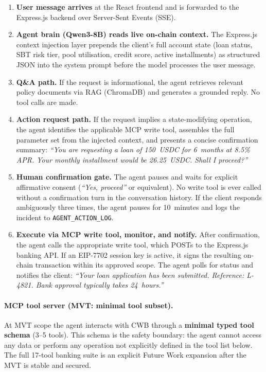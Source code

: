 \documentclass[12pt,a4paper]{report}
\begin{document}
\begin{enumerate}[noitemsep]
\item \textbf{User message arrives} at the React frontend and is forwarded to the Express.js backend over Server-Sent Events (SSE).
\item \textbf{Agent brain (Qwen3-8B) reads live on-chain context.} The Express.js context injection layer prepends the client's full account state (loan status, SBT risk tier, pool utilisation, credit score, active installments) as structured JSON into the system prompt before the model processes the user message.
\item \textbf{Q\&A path.} If the request is informational, the agent retrieves relevant policy documents via RAG (ChromaDB) and generates a grounded reply. No tool calls are made.
\item \textbf{Action request path.} If the request implies a state-modifying operation, the agent identifies the applicable MCP write tool, assembles the full parameter set from the injected context, and presents a concise confirmation summary: \emph{``You are requesting a loan of 150~USDC for 6~months at 8.5\% APR. Your monthly installment would be 26.25~USDC. Shall I proceed?''}
\item \textbf{Human confirmation gate.} The agent pauses and waits for explicit affirmative consent (\emph{``Yes, proceed''} or equivalent). No write tool is ever called without a confirmation turn in the conversation history. If the client responds ambiguously three times, the agent pauses for 10~minutes and logs the incident to \texttt{AGENT\_ACTION\_LOG}.
\item \textbf{Execute via MCP write tool, monitor, and notify.} After confirmation, the agent calls the appropriate write tool, which POSTs to the Express.js banking API. If an EIP-7702 session key is active, it signs the resulting on-chain transaction within its approved scope. The agent polls for status and notifies the client: \emph{``Your loan application has been submitted. Reference: L-4821. Bank approval typically takes 24~hours.''}
\end{enumerate}

\paragraph{MCP tool server (MVT: minimal tool subset).}

At MVT scope the agent interacts with CWB through a \textbf{minimal typed tool schema} (3--5 tools). This schema is the safety boundary: the agent cannot access any data or perform any operation not explicitly defined in the tool list below. The full 17-tool banking suite is an explicit Future Work expansion after the MVT is stable and secured.
\end{document}
